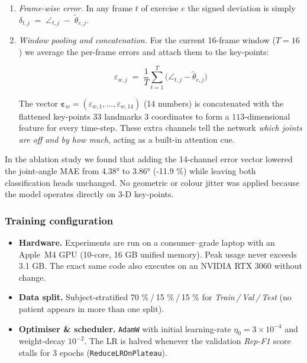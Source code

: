 \documentclass{article}
\begin{document}
\begin{enumerate}[label=\textbf{\Alph*.}, leftmargin=2em, itemsep=6pt]
\begin{enumerate}
\begin{enumerate}
\item \emph{Frame-wise error.}  
      In any frame $t$ of exercise $e$ the signed deviation is simply
      $\delta_{t,j} \;=\; \angle_{t,j} \;-\; \tilde{\theta}_{e,j}$.

\item \emph{Window pooling and concatenation.}  
      For the current 16-frame window ($T\!=\!16$) we average the
      per-frame errors and attach them to the key-points:

      \[
          \boxed{\;
            \varepsilon_{w,j}
            \;=\;
            \frac{1}{T}\sum_{t=1}^{T}
            \bigl(
              \angle_{t,j} - \tilde{\theta}_{e,j}
            \bigr)
          \;}
      \]

      The vector
      $\boldsymbol{\varepsilon}_{w}\!=\!(\varepsilon_{w,1},\ldots,\varepsilon_{w,14})$
      (14 numbers) is concatenated with the flattened
      key-points 33 landmarks 3 coordinates to
      form a $113$-dimensional feature for every time-step.
      These extra channels tell the network \emph{which joints are off
      and by how much}, acting as a built-in attention cue.
\end{enumerate}
\end{enumerate}


In the ablation study we found that adding the 14-channel error vector lowered the joint-angle MAE from 4.38° to 3.86° (-11.9 \%) while leaving both classification heads unchanged. No geometric or colour jitter was applied because the model operates directly on 3-D key-points.

\subsubsection{Training configuration}
\label{sec:train}

\begin{itemize}[leftmargin=1.5em, itemsep=4pt]
  \item \textbf{Hardware.}  
        Experiments are run on a consumer–grade laptop with an \mbox{Apple M4}  
        GPU (10-core, 16 GB unified memory).  Peak usage never exceeds 3.1 GB.  
        The exact same code also executes on an NVIDIA RTX 3060 without change.

  \item \textbf{Data split.}  
        Subject-stratified  
        70 \% / 15 \% / 15 \% for \textit{Train / Val / Test}   
        (no patient appears in more than one split).

  \item \textbf{Optimiser \& scheduler.}  
        \texttt{AdamW} with initial learning-rate  
        $\eta_0 = 3\times10^{-4}$ and weight-decay $10^{-2}$.  
        The LR is halved whenever the validation \textit{Rep-F1} score  
        stalls for 3 epochs (\texttt{ReduceLROnPlateau}).


\end{itemize}
\end{enumerate}
\end{document}

